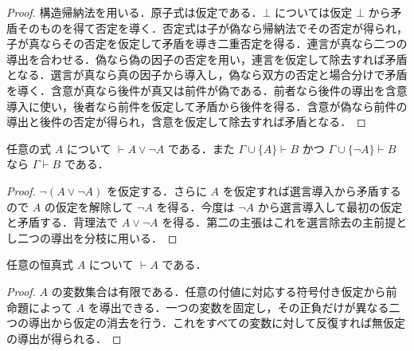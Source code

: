 \begin{proof}
構造帰納法を用いる．原子式は仮定である．$\bot$ については仮定 $\bot$ から矛盾そのものを得て否定を導く．否定式は子が偽なら帰納法でその否定が得られ，子が真ならその否定を仮定して矛盾を導き二重否定を得る．連言が真なら二つの導出を合わせる．偽なら偽の因子の否定を用い，連言を仮定して除去すれば矛盾となる．選言が真なら真の因子から導入し，偽なら双方の否定と場合分けで矛盾を導く．含意が真なら後件が真又は前件が偽である．前者なら後件の導出を含意導入に使い，後者なら前件を仮定して矛盾から後件を得る．含意が偽なら前件の導出と後件の否定が得られ，含意を仮定して除去すれば矛盾となる．
\end{proof}
\begin{prop}[排中律と仮定の消去]
任意の式 $A$ について $\vdash A\lor\neg A$ である．また $\Gamma\cup\{A\}\vdash B$ かつ $\Gamma\cup\{\neg A\}\vdash B$ なら $\Gamma\vdash B$ である．
\end{prop}
\begin{proof}
$\neg(A\lor\neg A)$ を仮定する．さらに $A$ を仮定すれば選言導入から矛盾するので $A$ の仮定を解除して $\neg A$ を得る．今度は $\neg A$ から選言導入して最初の仮定と矛盾する．背理法で $A\lor\neg A$ を得る．第二の主張はこれを選言除去の主前提とし二つの導出を分枝に用いる．
\end{proof}
\begin{prop}[恒真式に対する完全性]
任意の恒真式 $A$ について $\vdash A$ である．
\end{prop}
\begin{proof}
$A$ の変数集合は有限である．任意の付値に対応する符号付き仮定から前命題によって $A$ を導出できる．一つの変数を固定し，その正負だけが異なる二つの導出から仮定の消去を行う．これをすべての変数に対して反復すれば無仮定の導出が得られる．
\end{proof}
